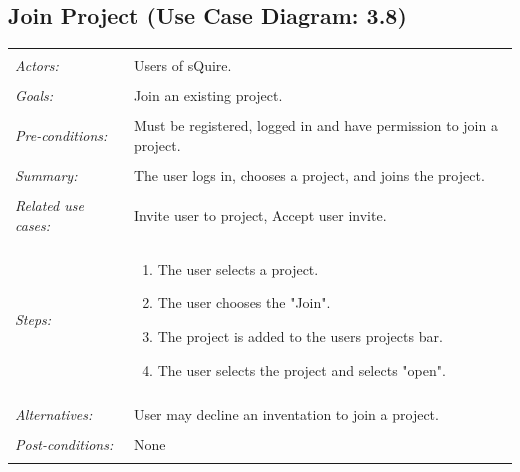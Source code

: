\documentclass[11pt]{report}
\begin{document}
\subsection{Join Project (Use Case Diagram: 3.8)}
\begin{tabular}{ p{2cm} p{12cm} }
\hline
\\
\textit{Actors:} & Users of sQuire. \\ 
\\
\textit{Goals:} & Join an existing project.\\
\\
\textit{Pre-conditions:} & Must be registered, logged in and have permission to join a project.\\
\\
\textit{Summary:} & The user logs in, chooses a project, and joins the project. \\
\\
\textit{Related use cases:} & Invite user to project, Accept user invite. \\
\\
\textit{Steps:} & \begin{enumerate}
 \item The user selects a project.
 \item The user chooses the "Join". 
 \item The project is added to the users projects bar.
 \item The user selects the project and selects "open".
\end{enumerate}\\
\\
\textit{Alternatives:} & User may decline an inventation to join a project. \\
\\
\textit{Post-conditions:} & None \\
\\
\hline
\end{tabular}
\end{document}
